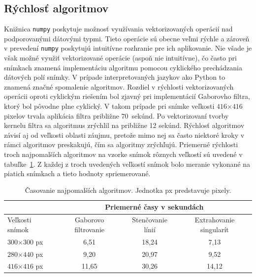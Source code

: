   \subsection{Rýchlosť algoritmov}
  Knižnica \texttt{numpy} poskytuje možnosť využívania vektorizovaných operácií nad podporovanými dátovými typmi. Tieto operácie sú obecne veľmi rýchle
  a zároveň v prevedení \texttt{numpy} poskytujú intuitívne rozhranie pre ich aplikovanie. Nie všade je však možné využiť vektorizované operácie
  (aspoň nie intuitívne), čo často pri snímkach znamená implementáciu algoritmu pomocou cyklického prechádzania dátových polí snímky. V prípade interpretovaných
  jazykov ako Python to znamená značné spomalenie algoritmov. Rozdiel v rýchlosti vektorizovaných operácii oproti cyklickým riešením bol zjavný pri
  implementácií Gaborovho filtra, ktorý bol pôvodne plne cyklický. V takom prípade pri snímke veľkosti $416$$\times{}$$416$ pixelov trvala aplikácia filtra približne
  70~sekúnd. Po vektorizovaní tvorby kernelu filtra sa algoritmus zrýchlil na približne 12 sekúnd. Rýchlosť algoritmov závisí aj od veľkosti oblasti záujmu,
  pretože mimo nej sa často niektoré kroky v rámci algoritmov preskakujú, čím sa algoritmy zrýchľujú. Priemerné rýchlosti troch najpomalších algoritmov
  na vzorke snímok rôznych veľkostí sú uvedené v tabuľke~{\ref{tab:casy_algo}}. Z každej z troch uvedených veľkostí snímok bolo meranie vykonané na piatich
  snímkach a tieto hodnoty spriemerované.
  \begin{table}[ht]
    \centering
    \caption{Časovanie najpomalších algoritmov. Jednotka px predstavuje pixely.}
    \begin{tabular}{ l|c|c|c| }
      \cline{2-4}
                        & \multicolumn{3}{|c|}{Priemerné časy v sekundách} \\
      \cline{2-4}
      \hline
      \multicolumn{1}{|l|}{Veľkosti snímok}   & Gaborovo filtrovanie & Stenčovanie línií & Extrahovanie singularít \\
      \hline
      \multicolumn{1}{|l|}{$300$$\times{}$$300$ px} & 6,51 & 18,24 & 7,13 \\
      \multicolumn{1}{|l|}{$280$$\times{}$$440$ px} & 9,20 & 20,97 & 9,52 \\
      \multicolumn{1}{|l|}{$416$$\times{}$$416$ px} & 11,65 & 30,26 & 14,12 \\
      \hline
    \end{tabular}
    \label{tab:casy_algo}
  \end{table}

